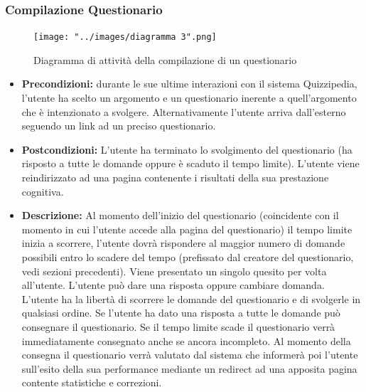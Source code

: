 \documentclass[a4paper,11pt]{article}
\begin{document}
\subsubsection{Compilazione Questionario}
\begin{figure}[h!]
\begin{center}
	\texttt{[image: "../images/diagramma 3".png]}
	\caption{Diagramma di attività della compilazione di un questionario}
\end{center}
\end{figure}
\begin{itemize}
\item\textbf{Precondizioni:} durante le sue ultime interazioni con il sistema Quizzipedia, l'utente ha scelto un argomento e un questionario inerente a quell'argomento che è intenzionato a svolgere. Alternativamente l'utente arriva dall'esterno seguendo un link ad un preciso questionario.
\item\textbf{Postcondizioni:} L'utente ha terminato lo svolgimento del questionario (ha risposto a tutte le domande oppure è scaduto il tempo limite). L'utente viene reindirizzato ad una pagina contenente i risultati della sua prestazione cognitiva.
\item\textbf{Descrizione:} Al momento dell'inizio del questionario (coincidente con il momento in cui l'utente accede alla pagina del questionario) il tempo limite inizia a scorrere, l'utente dovrà rispondere al maggior numero di domande possibili entro lo scadere del tempo (prefissato dal creatore del questionario, vedi sezioni precedenti). Viene presentato un singolo quesito per volta all'utente. L'utente può dare una risposta oppure cambiare domanda. L'utente ha la libertà di scorrere le domande del questionario e di svolgerle in qualsiasi ordine. Se l'utente ha dato una risposta a tutte le domande può consegnare il questionario. Se il tempo limite scade il questionario verrà immediatamente consegnato anche se ancora incompleto. Al momento della consegna il questionario verrà valutato dal sistema che informerà poi l'utente sull'esito della sua performance mediante un redirect ad una apposita pagina contente statistiche e correzioni.
\end{itemize}

\newpage
\end{document}
